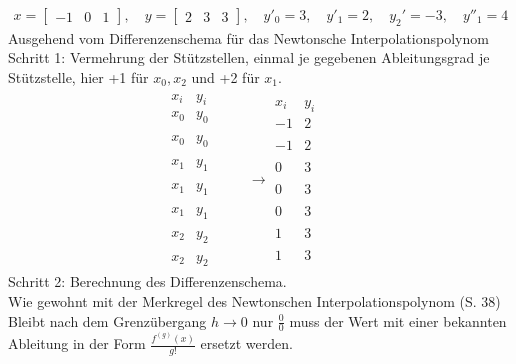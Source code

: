 \documentclass[10pt,a4paper]{article}
\begin{document}
	\begin{align*}
		x = \begin{bmatrix}-1 & 0 & 1\end{bmatrix},\quad y = \begin{bmatrix}2 & 3 & 3\end{bmatrix} ,\quad y'_0 = 3,\quad y'_1 = 2,\quad y_2'=-3,\quad y''_1=4
	\end{align*}
	 Ausgehend vom Differenzenschema für das Newtonsche Interpolationspolynom \\
	 Schritt 1: Vermehrung der Stützstellen, einmal je gegebenen Ableitungsgrad je Stützstelle, hier +1 für $x_0, x_2$ und +2 für $x_1$.
	 \begin{align*}
		 \begin{array}{cc|cccc}
		 	x_i & y_i &  &  &  \\ \hline
		 	x_0 & y_0 &  &  \\
		 	    &     &  &  \\
		 	x_0 & y_0 &  &  \\
		 	    &     &  &  \\
		 	x_1 & y_1 &  &  \\
		 	    &     &  &  \\
		 	x_1 & y_1 &  &  \\
		 	    &     &  &  \\
		 	x_1 & y_1 &  &  \\
		 	    &     &  &  \\
		 	x_2 & y_2 &  &  \\
		 	    &     &  &  \\
		 	x_2 & y_2 &
		 \end{array}
	        \rightarrow
			\begin{array}{cc|cccc}
				x_i & y_i &  &  &  \\ \hline
				-1  &  2  &  &  \\
				    &     &  &  \\
				-1  &  2  &  &  \\
				    &     &  &  \\
				 0  &  3  &  &  \\
				    &     &  &  \\
				 0  &  3  &  &  \\
				    &     &  &  \\
				 0  &  3  &  &  \\
				    &     &  &  \\
				 1  &  3  &  &  \\
				    &     &  &  \\
				 1  &  3  &  &
			\end{array}
		\end{align*}
	\newpage
	Schritt 2: Berechnung des Differenzenschema. \\
	Wie gewohnt mit der Merkregel des Newtonschen Interpolationspolynom (S. 38) \\
	Bleibt nach dem Grenzübergang $h \rightarrow 0$ nur $\frac{0}{0}$ muss der Wert mit einer bekannten Ableitung in der Form $\frac{f^{(g)}(x)}{g!}$ ersetzt werden.
	
\end{document}
